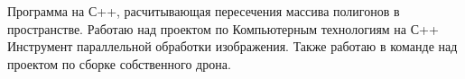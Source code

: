 
\nocite{*}


Программа на С++, расчитывающая пересечения массива полигонов в пространстве. Работаю над проектом по Компьютерным технологиям на С++ Инструмент параллельной обработки изображения. Также работаю в команде над проектом по сборке собственного дрона.
